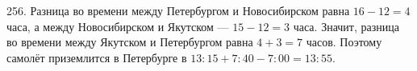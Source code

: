 256. Разница во времени между Петербургом и Новосибирском равна $16-12=4$ часа, а между Новосибирском и Якутском --- $15-12=3$ часа. Значит, разница во времени между Якутском и Петербургом равна $4+3=7$ часов. Поэтому самолёт приземлится в Петербурге в $13:15+7:40-7:00=13:55.$\\

